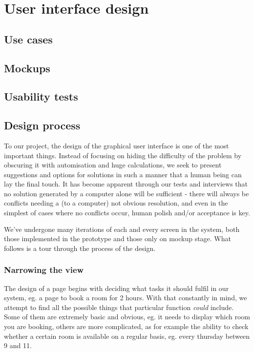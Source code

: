 \chapter{User interface design}
\label{chap:user_interface_design}

\section{Use cases}
\label{sec:use_cases}

\section{Mockups} %
\label{sec:mockups}


\section{Usability tests} %
\label{sec:usability_tests}



\section{Design process}
\label{sec:design_process}
To our project, the design of the graphical user interface is one of the most important things. Instead of focusing on hiding the difficulty of the problem by obscuring it with automisation and huge calculations, we seek to present suggestions and options for solutions in such a manner that a human being can lay the final touch. It has become apparent through our tests and interviews that no solution generated by a computer alone will be sufficient - there will always be conflicts needing a (to a computer) not obvious resolution, and even in the simplest of cases where no conflicts occur, human polish and/or acceptance is key.

We've undergone many iterations of each and every screen in the system, both those implemented in the prototype and those only on mockup stage. What follows is a tour through the process of the design.



\subsection{Narrowing the view}
The design of a page begins with deciding what tasks it should fulfil in our system, eg. a page to book a room for 2 hours. With that constantly in mind, we attempt to find all the possible things that particular function \emph{could} include. Some of them are extremely basic and obvious, eg. it needs to display which room you are booking, others are more complicated, as for example the ability to check whether a certain room is available on a regular basis, eg. every thursday between 9 and 11.

